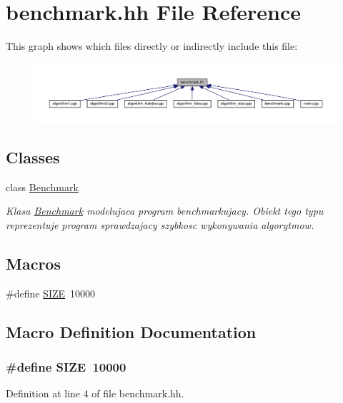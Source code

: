 \hypertarget{benchmark_8hh}{}\section{benchmark.\+hh File Reference}
\label{benchmark_8hh}
This graph shows which files directly or indirectly include this file\+:\nopagebreak
\begin{figure}[H]
\begin{center}
\leavevmode
\includegraphics[width=350pt]{benchmark_8hh__dep__incl}
\end{center}
\end{figure}
\subsection*{Classes}
\begin{DoxyCompactItemize}
\item 
class \hyperlink{class_benchmark}{Benchmark}
\begin{DoxyCompactList}\small\item\em Klasa \hyperlink{class_benchmark}{Benchmark} modelujaca program benchmarkujacy. Obiekt tego typu reprezentuje program sprawdzajacy szybkosc wykonywania algorytmow. \end{DoxyCompactList}\end{DoxyCompactItemize}
\subsection*{Macros}
\begin{DoxyCompactItemize}
\item 
\#define \hyperlink{benchmark_8hh_a70ed59adcb4159ac551058053e649640}{S\+I\+Z\+E}~10000
\end{DoxyCompactItemize}


\subsection{Macro Definition Documentation}
\hypertarget{benchmark_8hh_a70ed59adcb4159ac551058053e649640}{}
\subsubsection[{S\+I\+Z\+E}]{\setlength{\rightskip}{0pt plus 5cm}\#define S\+I\+Z\+E~10000}\label{benchmark_8hh_a70ed59adcb4159ac551058053e649640}


Definition at line 4 of file benchmark.\+hh.

